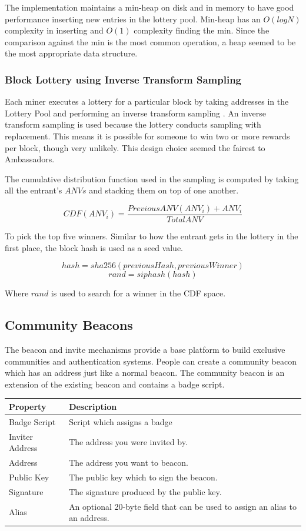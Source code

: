 \documentclass{article}
\begin{document}
The implementation maintains a min-heap on disk and in memory to have good performance 
inserting new entries in the lottery pool. Min-heap has an $O(log N)$ complexity
in inserting and $O(1)$ complexity finding the min. Since the comparison against
the min is the most common operation, a heap seemed to be the most appropriate
data structure.

\subsubsection{Block Lottery using Inverse Transform Sampling}

Each miner executes a lottery for a particular block by taking addresses in
the Lottery Pool and performing an inverse transform sampling \cite{inverse}.
An inverse transform sampling is used because the lottery conducts sampling
with replacement. This means it is possible for someone to win two or more
rewards per block, though very unlikely. This design choice seemed the fairest to
Ambassadors.

The cumulative distribution function used in the sampling is computed by taking
all the entrant's $ANVs$ and stacking them on top of one another.

$$CDF(ANV_i) = \frac{PreviousANV(ANV_i) + ANV_i}{TotalANV}$$

To pick the top five winners. Similar to how the entrant gets in the lottery in the
first place, the block hash is used as a seed value.

$$hash = sha256(previousHash, previousWinner)$$
$$rand = siphash(hash)$$

Where $rand$ is used to search for a winner in the CDF space.

\subsection{Community Beacons}

The beacon and invite mechanisms provide a base platform to build exclusive
communities and authentication systems. People can create a community beacon
which has an address just like a normal beacon. The community beacon is an
extension of the existing beacon and contains a badge script.

\begin{center}
    \begin{tabular}{l|p{9cm}}
        Property & Description \\ \hline
        Badge Script & Script which assigns a badge \\
        Inviter Address & The address you were invited by. \\
        Address & The address you want to beacon. \\
        Public Key & The public key which to sign the beacon. \\
        Signature & The signature produced by the public key. \\
        Alias & An optional 20-byte field that can be used to assign an alias to an address.\\
    \end{tabular}
\end{center}
\end{document}
